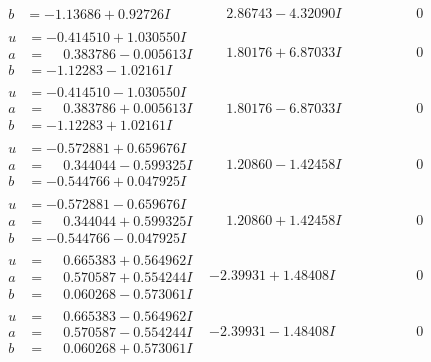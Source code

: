 \documentclass[1p]{elsarticle_modified}
\theoremstyle{definition}
\begin{document}
$$\begin{array}{c|c|c}
\begin{aligned}
b &= -1.13686 + 0.92726 I\end{aligned}
 & \phantom{-}2.86743 - 4.32090 I & \phantom{-0.000000 } 0 \\ \hline\begin{aligned}
u &= -0.414510 + 1.030550 I \\
a &= \phantom{-}0.383786 - 0.005613 I \\
b &= -1.12283 - 1.02161 I\end{aligned}
 & \phantom{-}1.80176 + 6.87033 I & \phantom{-0.000000 } 0 \\ \hline\begin{aligned}
u &= -0.414510 - 1.030550 I \\
a &= \phantom{-}0.383786 + 0.005613 I \\
b &= -1.12283 + 1.02161 I\end{aligned}
 & \phantom{-}1.80176 - 6.87033 I & \phantom{-0.000000 } 0 \\ \hline\begin{aligned}
u &= -0.572881 + 0.659676 I \\
a &= \phantom{-}0.344044 - 0.599325 I \\
b &= -0.544766 + 0.047925 I\end{aligned}
 & \phantom{-}1.20860 - 1.42458 I & \phantom{-0.000000 } 0 \\ \hline\begin{aligned}
u &= -0.572881 - 0.659676 I \\
a &= \phantom{-}0.344044 + 0.599325 I \\
b &= -0.544766 - 0.047925 I\end{aligned}
 & \phantom{-}1.20860 + 1.42458 I & \phantom{-0.000000 } 0 \\ \hline\begin{aligned}
u &= \phantom{-}0.665383 + 0.564962 I \\
a &= \phantom{-}0.570587 + 0.554244 I \\
b &= \phantom{-}0.060268 - 0.573061 I\end{aligned}
 & -2.39931 + 1.48408 I & \phantom{-0.000000 } 0 \\ \hline\begin{aligned}
u &= \phantom{-}0.665383 - 0.564962 I \\
a &= \phantom{-}0.570587 - 0.554244 I \\
b &= \phantom{-}0.060268 + 0.573061 I\end{aligned}
 & -2.39931 - 1.48408 I & \phantom{-0.000000 } 0 \\ \hline\begin{aligned}

\end{aligned}
\end{array}$$
\end{document}
